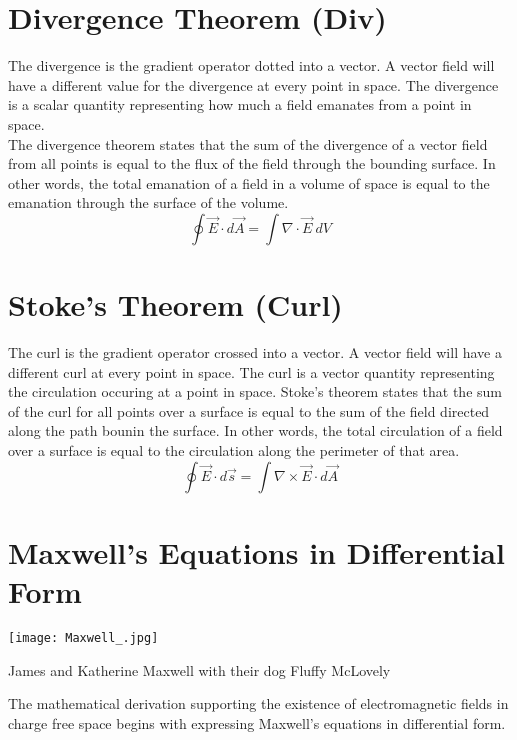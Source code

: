 \section{Divergence Theorem (Div)}
The divergence is the gradient operator dotted into a vector.  A vector field will have a different value for the divergence at every point in space.  The divergence is a scalar quantity representing how much a field emanates from a point in space.  \\
The divergence theorem states that the sum of the divergence of a vector field from all points is equal to the flux of the field through the bounding surface.  In other words, the total emanation of a field in a volume of space is equal to the  emanation through the surface of the volume.
$$\oint \overrightarrow{E} \cdot d\overrightarrow{A}=\int \nabla \cdot \overrightarrow{E} \ dV$$

\section{Stoke's Theorem (Curl)}
The curl is the gradient operator crossed into a vector.  A vector field will have a different curl at every point in space.  The curl is a vector quantity representing the circulation occuring at a point in space. 
Stoke's theorem states that the sum of the curl for all points over a surface is equal to the sum of the field directed along the path bounin the surface.  In other words, the total circulation of a field over a surface is equal to the circulation along the perimeter of that area. 
$$\oint \overrightarrow{E} \cdot d\overrightarrow{s}=\int \nabla \times \overrightarrow{E} \cdot d\overrightarrow{A}$$

\section{Maxwell's Equations in Differential Form}
\begin{marginfigure}[100pt]
  \texttt{[image: Maxwell\_.jpg]}
  \caption{James and Katherine Maxwell with their dog Fluffy McLovely}
  \label{fig:marginfig}
\end{marginfigure}
The mathematical derivation supporting the existence of electromagnetic fields in charge free space begins with expressing Maxwell's equations in differential form.

